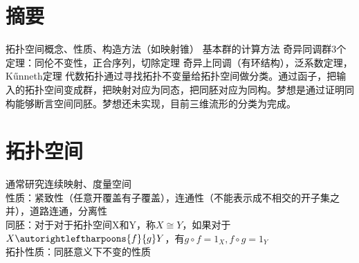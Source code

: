 \documentclass[UTF8]{article}
\begin{document}
\section{摘要}
拓扑空间概念、性质、构造方法（如映射锥）
基本群的计算方法
奇异同调群3个定理：同伦不变性，正合序列，切除定理
奇异上同调（有环结构），泛系数定理，K\H unneth定理
代数拓扑通过寻找拓扑不变量给拓扑空间做分类。通过函子，把输入的拓扑空间变成群，把映射对应为同态，把同胚对应为同构。梦想是通过证明同构能够断言空间同胚。梦想还未实现，目前三维流形的分类为完成。
\section{拓扑空间}
通常研究连续映射、度量空间\\
性质：紧致性（任意开覆盖有子覆盖），连通性（不能表示成不相交的开子集之并），道路连通，分离性\\
同胚：对于对于拓扑空间X和Y，称$X\cong Y$，如果对于$ X \autorightleftharpoons{f}{g}Y $，有$ g\circ f =1_X,f\circ g=1_Y $\\
拓扑性质：同胚意义下不变的性质















 
\begin{comment}
    dsa 
    X \autorightleftharpoons{d969696}{3}Y
    \overset{f}{ \underset{g}{\rightleftharpoons} } 
    \xlongequal[d]{dfafdsf}
    \autorightleftharpoons{f}{g} Z

    \begin{equation}
    \label{homeomorphism}
    \begin{split}
        &\text{if: }X \autorightleftharpoons{f}{g}Y\\
        &\text{where: }g\circ f =1_X,f\circ g=1_Y\\
        &\text{then: }X\cong Y\\
    \end{split}
    \end{equation}

\end{comment}
\end{document}
